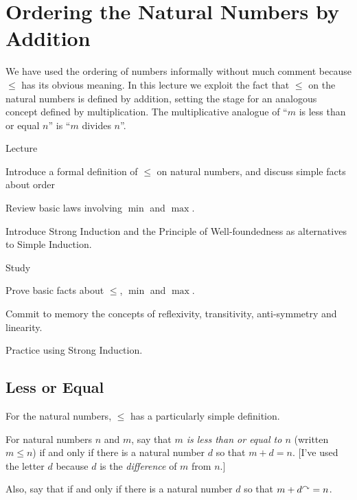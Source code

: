 \chapter{Ordering the Natural Numbers by Addition}\label{lec:NatOrdering}

We have used the ordering of numbers informally without much comment
because $\leq$ has its obvious meaning. In this lecture 
we exploit the fact that $\leq$ on the natural numbers is defined by addition, setting the stage for an
analogous concept defined by multiplication. The multiplicative
analogue of ``$m$ is less than or equal $n$'' is ``$m$ divides $n$''.

\begin{goals}
\begin{goal}{Lecture}
\item Introduce a formal definition of $\leq$ on natural numbers, and discuss simple facts about order
\item Review basic laws involving $\min$ and $\max$.
\item Introduce Strong Induction and the Principle of Well-foundedness as alternatives to Simple Induction.
\end{goal}

\begin{goal}{Study}
\item Prove basic facts about $\leq$, $\min$ and $\max$.
\item Commit to memory the concepts of reflexivity, transitivity, anti-symmetry and linearity.
\item Practice using Strong Induction.
\end{goal}
\end{goals}


\section{Less or Equal}

For the natural numbers, $\leq$ has a particularly simple definition.

\begin{defn}
  For natural numbers $n$ and $m$, say that \emph{$m$ is less than or equal to $n$} (written $m\leq n$)
  if and only if there is a
  natural number $d$ so that $m+d = n$.  [I've used the letter $d$
  because $d$ is the \emph{difference} of $m$ from $n$.]
  
  Also, say that  if and only if there is a natural number $d$ so that $m + d^\curvearrowright = n$.
\end{defn}

